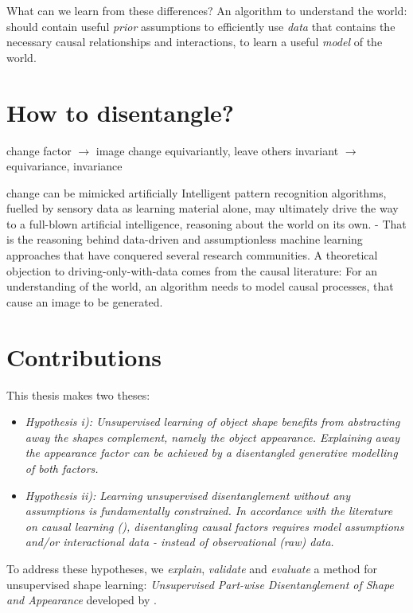 	What can we learn from these differences? An algorithm to understand the world: should contain useful \textit{prior} assumptions to efficiently use \textit{data} that contains the necessary causal relationships and interactions, to learn a useful \textit{model} of the world.



\section{How to disentangle?}
	change factor $\rightarrow$  image change equivariantly, leave others invariant
	$\rightarrow$  equivariance, invariance

	change can be mimicked artificially
	Intelligent pattern recognition algorithms, fuelled by sensory data as learning material alone, may ultimately drive the way to a full-blown artificial intelligence, reasoning about the world on its own. - That is the reasoning behind data-driven and assumptionless machine learning approaches that have conquered several research communities.
	A theoretical objection to driving-only-with-data comes from the causal literature: For an understanding of the world, an algorithm needs to model causal processes, that cause an image to be generated.

\section{Contributions}
	This thesis makes two theses:
	\begin{itemize}
		\item  \textit{Hypothesis \emph{i)}: Unsupervised learning of object shape benefits from abstracting away the shapes complement, namely the object appearance. Explaining away the appearance factor can be achieved by a disentangled generative modelling of both factors.}
		\item \textit{Hypothesis \emph{ii)}: Learning unsupervised disentanglement without any assumptions is fundamentally constrained. In accordance with the literature on causal learning (\cite{Pearl:2018im}), disentangling causal factors requires model assumptions and/or interactional data - instead of observational (raw) data.}
	\end{itemize}
	To address these hypotheses, we \textit{explain}, \textit{validate} and \textit{evaluate} a method for unsupervised shape learning: \textit{Unsupervised Part-wise Disentanglement of Shape and Appearance} developed by .


